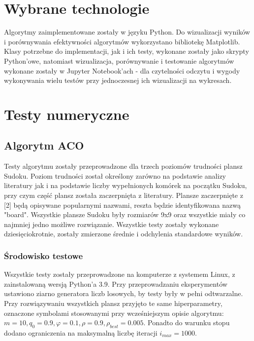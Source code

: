 \documentclass[11pt]{scrartcl} %
\begin{document}
\section{Wybrane technologie}
Algorytmy zaimplementowane zostały w języku Python. Do wizualizacji wyników i porównywania efektywności algorytmów wykorzystano bibliotekę Matplotlib. Klasy potrzebne do implementacji, jak i ich testy, wykonane zostały jako skrypty Python'owe, natomiast wizualizacja, porównywanie i testowanie algorytmów wykonane zostały w Jupyter Notebook'ach - dla czytelności odczytu i wygody wykonywania wielu testów przy jednoczesnej ich wizualizacji na wykresach.

\section{Testy numeryczne}
\subsection{Algorytm ACO}
Testy algorytmu zostały przeprowadzone dla trzech poziomów trudności plansz Sudoku. Poziom trudności został określony zarówno na podstawie analizy literatury jak i na podstawie liczby wypełnionych komórek na początku Sudoku, przy czym część plansz została zaczerpnięta z literatury. Plansze zaczerpnięte z [2] będą opisywane popularnymi nazwami, reszta będzie identyfikowana nazwą "board". Wszystkie plansze Sudoku były rozmiarów 9x9 oraz wszystkie miały co najmniej jedno możliwe rozwiązanie. Wszystkie testy zostały wykonane dziesięciokrotnie, zostały zmierzone średnie i odchylenia standardowe wyników.
\subsubsection{Środowisko testowe}
Wszystkie testy zostały przeprowadzone na komputerze z systemem Linux, z zainstalowaną wersją Python'a 3.9. Przy przeprowadzaniu eksperymentów ustawiono ziarno generatora liczb losowych, by testy były w pełni odtwarzalne. 
Przy rozwiązywaniu wszystkich plansz przyjęto te same hiperparametry, oznaczone symbolami stosowanymi przy wcześniejszym opisie algorytmu: $m=10, q_0=0.9, \varphi=0.1, \rho=0.9, \rho_{best}=0.005$. Ponadto do warunku stopu dodano ograniczenia na maksymalną liczbę iteracji $i_{max}=1000$. 
\end{document}
